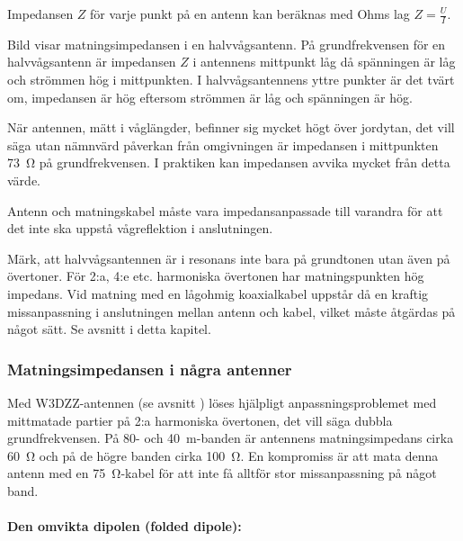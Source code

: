 
Impedansen \(Z\) för varje punkt på en antenn kan beräknas med Ohms lag
\(Z = \frac{U}{I}\).

Bild  visar matningsimpedansen i en halvvågsantenn.
På grundfrekvensen för en halvvågsantenn är impedansen \(Z\) i antennens
mittpunkt låg då spänningen är låg och strömmen hög i mittpunkten.
I halvvågsantennens yttre punkter är det tvärt om, impedansen är hög eftersom
strömmen är låg och spänningen är hög.

När antennen, mätt i våglängder, befinner sig mycket högt över jordytan, det
vill säga utan nämnvärd påverkan från omgivningen är impedansen i mittpunkten
\SI{73}{\ohm} på grundfrekvensen.
I praktiken kan impedansen avvika mycket från detta värde.

Antenn och matningskabel måste vara impedansanpassade till varandra
för att det inte ska uppstå vågreflektion i anslutningen.

Märk, att halvvågsantennen är i resonans inte bara på grundtonen utan även på
övertoner.
För 2:a, 4:e etc. harmoniska övertonen har matningspunkten hög impedans.
Vid matning med en lågohmig koaxialkabel uppstår då en kraftig missanpassning i
anslutningen mellan antenn och kabel, vilket måste åtgärdas på något sätt.
Se avsnitt  i detta kapitel.

\subsubsection{Matningsimpedansen i några antenner}

Med W3DZZ-antennen (se avsnitt ) löses hjälpligt anpassningsproblemet
med mittmatade partier på 2:a harmoniska övertonen, det vill säga dubbla
grundfrekvensen.
På 80- och \SI{40}{\metre}-banden är antennens matningsimpedans cirka
\SI{60}{\ohm} och på de högre banden cirka \SI{100}{\ohm}.
En kompromiss är att mata denna antenn med en \SI{75}{\ohm}-kabel för att inte
få alltför stor missanpassning på något band.

\paragraph{Den omvikta dipolen (folded dipole):}

